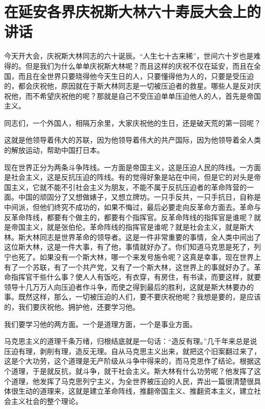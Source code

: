 \section[在延安各界庆祝斯大林六十寿辰大会上的讲话（一九三九年十二月二十一日）]{在延安各界庆祝斯大林六十寿辰大会上的讲话}


今天开大会，庆祝斯大林同志的六十诞辰。“人生七十古来稀”，世间六十岁也是难得的。但是我们为什么单单庆祝斯大林呢？而且这样的庆祝不仅在延安，而且在全国，而且在全世界只要晓得他今天生日的人，只要懂得他为人的，只要是受压迫的，都会庆祝他，原因就在于斯大林同志是一切被压迫者的救星。哪些人是反对庆祝他，而不希望庆祝他的呢？那就是自己不受压迫单单压迫他人的人，首先是帝国主义。

同志们，一个外国人，相隔万余里，大家庆祝他的生日，还是破天荒的第一回呢？

这就是他领导着伟大的苏联，因为他领导着伟大的共产国际，因为他领导着全人类的解放运动，帮助中国打日本。

现在世界正分为两条斗争阵线。一方面是帝国主义，这是压迫人民的阵线。一方面是社会主义，这是反抗压迫的阵线。有的觉得好象是站在中间，但是它的对头是帝国主义，它就不能不引社会主义为朋友，不能不属于反抗压迫者的革命阵营的一面。中国的顽固分了又想做婊子，又想立牌坊。一只手反共，一只手抗日，自称是中间派，但他们终究不成功的，如果不悔过，最后必要走向反革命方面去。革命与反革命阵线，都要有个做主的，都要有个指挥官。反革命阵线的指挥官是谁呢？就是帝国主义，就是张伯伦。革命阵线的指挥官是谁呢？就是社会主义，就是斯大林。斯大林同志是世界革命的领导者。这是一件非常重要的事情，全人类中间出了这位斯大林，这是一件大事，有了他，事情就好办了。你们知道马克思是死了，列宁也死了。如果没有一个斯大林，哪一个来发号施令呢？这真是幸事，现在世界上有了一个苏联，有了一个共产党，又有了一个斯大林，这世界上的事就好办了。革命指挥官干些什么事？使人人有饭吃，有衣穿，有房住，有书读，而要这样，就要领导十几万万人向压迫者作斗争，而使之得到最后的胜利，这就是斯大林要办的事。既然这样，那么，一切被压迫的人们，要不要庆祝他呢？我想是要的，是应该的，我们要庆祝他。拥护他，还要学习他。

我们要学习他的两方面。一个是道理方面，一个是事业方面。

马克思主义的道理千条万绪，归根结底就是一句话：“造反有理。”几千年来总是说压迫有理，剥削有理，造反无理。自从马克思主义出来，就把这个旧案翻过来了，这是个大功劳，这个道理是无产阶级从斗争中得来的，而马克思作了结论。根据这个道理，于是就反抗，就斗争，就干社会主义。斯大林有什么功劳呢？他发挥了这个道理，他发挥了马克思列宁主义，为全世界被压迫的人民，弄出一篇很清楚很具体很生动的道理来，这就是建立革命阵线，推翻帝国主义、推翻资本主义，建立社会主义社会的整个理论。

